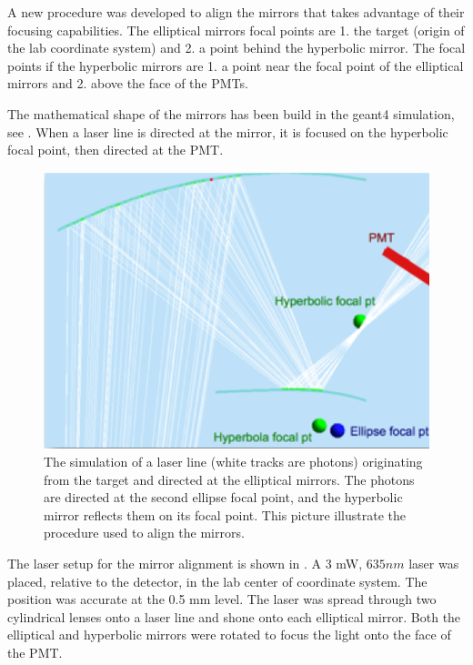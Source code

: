 A new procedure was developed to align the mirrors that takes advantage of their focusing capabilities. The elliptical mirrors focal points are 1. the target
(origin of the lab coordinate system)
and 2. a point behind the hyperbolic mirror. The focal points if the hyperbolic mirrors are 1. a point near the focal point of the elliptical mirrors and
2. above the face of the PMTs.

The mathematical shape of the mirrors has been build in the geant4 simulation, see . When a laser line is directed at the mirror,
it is focused on the hyperbolic focal point, then directed at the PMT.

\begin{figure}
\centering
	\includegraphics[width=1.0\columnwidth, keepaspectratio]{img/mirrorAlignmentSimulationZoomed.png}
	\caption{The simulation of a laser line (white tracks are photons) originating from the target and directed at the elliptical mirrors. The photons are directed
		      at the second ellipse focal point, and the hyperbolic mirror reflects them on its focal point. This picture illustrate the procedure used to align the mirrors.}
	\label{fig:alignmentSimulation}
\end{figure}

The laser setup for the mirror alignment is shown in . A 3 mW, $635 nm$ laser was placed, relative to the detector,
in the lab center of coordinate system. The position was accurate at the 0.5 mm level. The laser was spread through two cylindrical lenses onto a laser line and shone
onto each elliptical mirror. Both the elliptical and hyperbolic mirrors were rotated to focus the light onto the face of the PMT.

